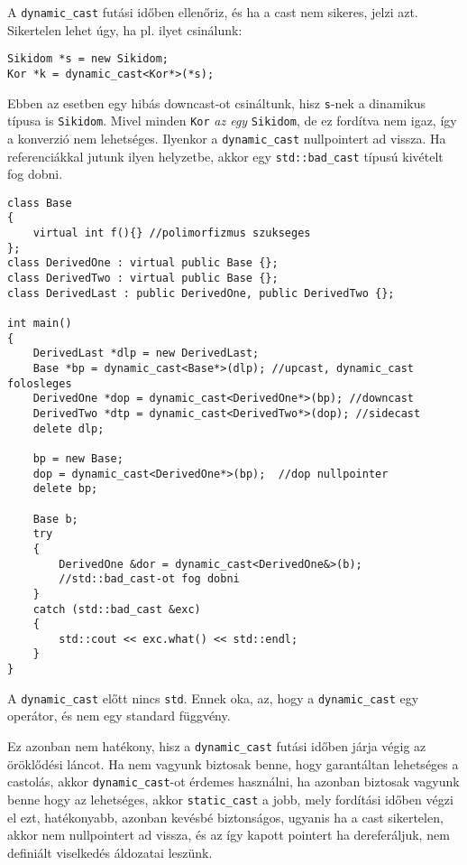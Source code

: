 \documentclass[a4paper,11.5pt]{article}
\begin{document}
	A \texttt{dynamic\_cast} futási időben ellenőriz, és ha a cast nem sikeres, jelzi azt. Sikertelen lehet úgy, ha pl. ilyet csinálunk:
	\begin{lstlisting}
Sikidom *s = new Sikidom;
Kor *k = dynamic_cast<Kor*>(*s);
	\end{lstlisting}
	Ebben az esetben egy hibás downcast-ot csináltunk, hisz \texttt{s}-nek a dinamikus típusa is \texttt{Sikidom}. Mivel minden \texttt{Kor} \textit{az egy} \texttt{Sikidom}, de ez fordítva nem igaz, így a konverzió nem lehetséges. Ilyenkor a \texttt{dynamic\_cast} nullpointert ad vissza. Ha referenciákkal jutunk ilyen helyzetbe, akkor egy \texttt{std::bad\_cast} típusú kivételt fog dobni.
	\begin{lstlisting}
class Base 
{
	virtual int f(){} //polimorfizmus szukseges
};
class DerivedOne : virtual public Base {};
class DerivedTwo : virtual public Base {};
class DerivedLast : public DerivedOne, public DerivedTwo {};

int main()
{
	DerivedLast *dlp = new DerivedLast;
	Base *bp = dynamic_cast<Base*>(dlp); //upcast, dynamic_cast folosleges
	DerivedOne *dop = dynamic_cast<DerivedOne*>(bp); //downcast
	DerivedTwo *dtp = dynamic_cast<DerivedTwo*>(dop); //sidecast
	delete dlp;
	
	bp = new Base;
	dop = dynamic_cast<DerivedOne*>(bp);  //dop nullpointer
	delete bp;
	
	Base b;
	try
	{
		DerivedOne &dor = dynamic_cast<DerivedOne&>(b); 
		//std::bad_cast-ot fog dobni
	}
	catch (std::bad_cast &exc)
	{
		std::cout << exc.what() << std::endl;
	}
}
	\end{lstlisting}	
	\begin{note}
		A \texttt{dynamic\_cast} előtt nincs \texttt{std}. Ennek oka, az, hogy a \texttt{dynamic\_cast} egy operátor, és nem egy standard függvény.
	\end{note}
	
	Ez azonban nem hatékony, hisz a \texttt{dynamic\_cast} futási időben járja végig az öröklődési láncot. Ha nem vagyunk biztosak benne, hogy garantáltan lehetséges a castolás, akkor \texttt{dynamic\_cast}-ot érdemes használni, ha azonban biztosak vagyunk benne hogy az lehetséges, akkor \texttt{static\_cast} a jobb, mely fordítási időben végzi el ezt, hatékonyabb, azonban kevésbé biztonságos, ugyanis ha a cast sikertelen, akkor nem nullpointert ad vissza, és az így kapott pointert ha dereferáljuk, nem definiált viselkedés áldozatai leszünk.
\end{document}
